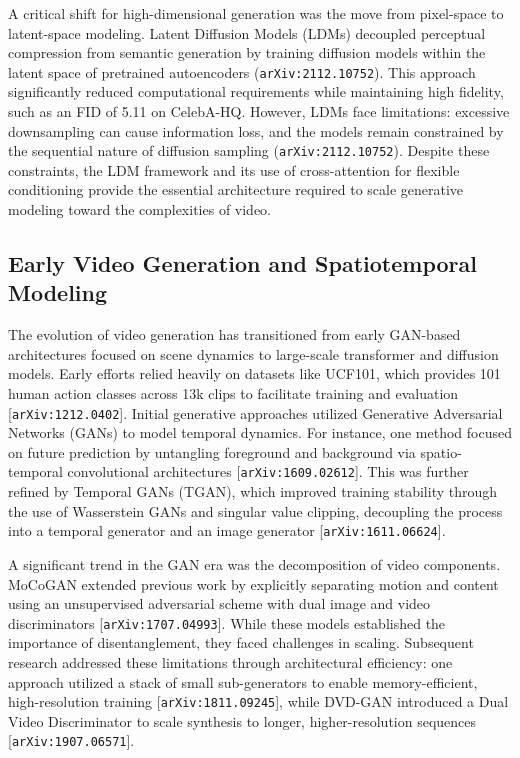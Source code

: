 \documentclass[11pt]{article}
\begin{document}
A critical shift for high-dimensional generation was the move from pixel-space to latent-space modeling. Latent Diffusion Models (LDMs) decoupled perceptual compression from semantic generation by training diffusion models within the latent space of pretrained autoencoders (\texttt{arXiv:2112.10752}). This approach significantly reduced computational requirements while maintaining high fidelity, such as an FID of 5.11 on CelebA-HQ. However, LDMs face limitations: excessive downsampling can cause information loss, and the models remain constrained by the sequential nature of diffusion sampling (\texttt{arXiv:2112.10752}). Despite these constraints, the LDM framework and its use of cross-attention for flexible conditioning provide the essential architecture required to scale generative modeling toward the complexities of video.

\subsection{Early Video Generation and Spatiotemporal Modeling}

The evolution of video generation has transitioned from early GAN-based architectures focused on scene dynamics to large-scale transformer and diffusion models. Early efforts relied heavily on datasets like UCF101, which provides 101 human action classes across 13k clips to facilitate training and evaluation [\texttt{arXiv:1212.0402}]. Initial generative approaches utilized Generative Adversarial Networks (GANs) to model temporal dynamics. For instance, one method focused on future prediction by untangling foreground and background via spatio-temporal convolutional architectures [\texttt{arXiv:1609.02612}]. This was further refined by Temporal GANs (TGAN), which improved training stability through the use of Wasserstein GANs and singular value clipping, decoupling the process into a temporal generator and an image generator [\texttt{arXiv:1611.06624}].

A significant trend in the GAN era was the decomposition of video components. MoCoGAN extended previous work by explicitly separating motion and content using an unsupervised adversarial scheme with dual image and video discriminators [\texttt{arXiv:1707.04993}]. While these models established the importance of disentanglement, they faced challenges in scaling. Subsequent research addressed these limitations through architectural efficiency: one approach utilized a stack of small sub-generators to enable memory-efficient, high-resolution training [\texttt{arXiv:1811.09245}], while DVD-GAN introduced a Dual Video Discriminator to scale synthesis to longer, higher-resolution sequences [\texttt{arXiv:1907.06571}].
\end{document}
